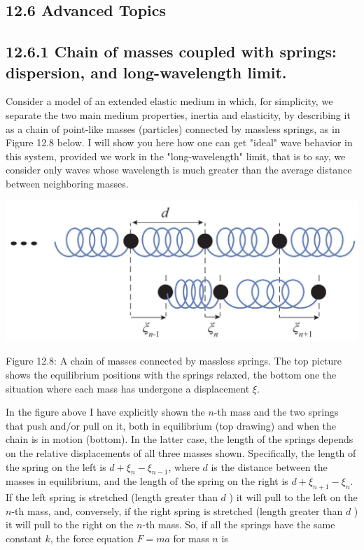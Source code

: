 \documentclass[10pt]{article}
\begin{document}
\subsection*{12.6 Advanced Topics}
\subsection*{12.6.1 Chain of masses coupled with springs: dispersion, and long-wavelength limit.}
Consider a model of an extended elastic medium in which, for simplicity, we separate the two main medium properties, inertia and elasticity, by describing it as a chain of point-like masses (particles) connected by massless springs, as in Figure 12.8 below. I will show you here how one can get "ideal" wave behavior in this system, provided we work in the "long-wavelength" limit, that is to say, we consider only waves whose wavelength is much greater than the average distance between neighboring masses.

\begin{center}
\includegraphics[max width=\textwidth]{2024_09_14_9969b06773f10b6936e8g-317}
\end{center}

Figure 12.8: A chain of masses connected by massless springs. The top picture shows the equilibrium positions with the springs relaxed, the bottom one the situation where each mass has undergone a displacement $\xi$.

In the figure above I have explicitly shown the $n$-th mass and the two springs that push and/or pull on it, both in equilibrium (top drawing) and when the chain is in motion (bottom). In the latter case, the length of the springs depends on the relative displacements of all three masses shown. Specifically, the length of the spring on the left is $d+\xi_{n}-\xi_{n-1}$, where $d$ is the distance between the masses in equilibrium, and the length of the spring on the right is $d+\xi_{n+1}-\xi_{n}$. If the left spring is stretched (length greater than $d$ ) it will pull to the left on the $n$-th mass, and, conversely, if the right spring is stretched (length greater than $d$ ) it will pull to the right on the $n$-th mass. So, if all the springs have the same constant $k$, the force equation $F=m a$ for mass $n$ is
\end{document}
